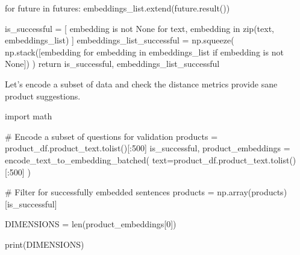 \documentclass[
  letterpaper,
  DIV=11,
  numbers=noendperiod]{scrreprt}
\newenvironment{Shaded}{\begin{snugshade}}{\end{snugshade}}
\newcommand{\BuiltInTok}[1]{\textcolor[rgb]{0.00,0.23,0.31}{#1}}
\newcommand{\CommentTok}[1]{\textcolor[rgb]{0.37,0.37,0.37}{#1}}
\newcommand{\ControlFlowTok}[1]{\textcolor[rgb]{0.00,0.23,0.31}{#1}}
\newcommand{\DecValTok}[1]{\textcolor[rgb]{0.68,0.00,0.00}{#1}}
\newcommand{\ImportTok}[1]{\textcolor[rgb]{0.00,0.46,0.62}{#1}}
\newcommand{\KeywordTok}[1]{\textcolor[rgb]{0.00,0.23,0.31}{#1}}
\newcommand{\NormalTok}[1]{\textcolor[rgb]{0.00,0.23,0.31}{#1}}
\newcommand{\OperatorTok}[1]{\textcolor[rgb]{0.37,0.37,0.37}{#1}}
\newcommand{\VariableTok}[1]{\textcolor[rgb]{0.07,0.07,0.07}{#1}}
\begin{document}
\begin{Shaded}
\begin{Highlighting}[]
        \ControlFlowTok{for}\NormalTok{ future }\KeywordTok{in}\NormalTok{ futures:}
\NormalTok{            embeddings\_list.extend(future.result())}

\NormalTok{    is\_successful }\OperatorTok{=}\NormalTok{ [}
\NormalTok{        embedding }\KeywordTok{is} \KeywordTok{not} \VariableTok{None} \ControlFlowTok{for}\NormalTok{ text, embedding }\KeywordTok{in} \BuiltInTok{zip}\NormalTok{(text, embeddings\_list)}
\NormalTok{    ]}
\NormalTok{    embeddings\_list\_successful }\OperatorTok{=}\NormalTok{ np.squeeze(}
\NormalTok{        np.stack([embedding }\ControlFlowTok{for}\NormalTok{ embedding }\KeywordTok{in}\NormalTok{ embeddings\_list }\ControlFlowTok{if}\NormalTok{ embedding }\KeywordTok{is} \KeywordTok{not} \VariableTok{None}\NormalTok{])}
\NormalTok{    )}
    \ControlFlowTok{return}\NormalTok{ is\_successful, embeddings\_list\_successful}
\end{Highlighting}
\end{Shaded}

Let's encode a subset of data and check the distance metrics provide
sane product suggestions.

\begin{Shaded}
\begin{Highlighting}[]
\ImportTok{import}\NormalTok{ math}

\CommentTok{\# Encode a subset of questions for validation}
\NormalTok{products }\OperatorTok{=}\NormalTok{ product\_df.product\_text.tolist()[:}\DecValTok{500}\NormalTok{]}
\NormalTok{is\_successful, product\_embeddings }\OperatorTok{=}\NormalTok{ encode\_text\_to\_embedding\_batched(}
\NormalTok{    text}\OperatorTok{=}\NormalTok{product\_df.product\_text.tolist()[:}\DecValTok{500}\NormalTok{]}
\NormalTok{)}

\CommentTok{\# Filter for successfully embedded sentences}
\NormalTok{products }\OperatorTok{=}\NormalTok{ np.array(products)[is\_successful]}
\end{Highlighting}
\end{Shaded}

\begin{Shaded}
\begin{Highlighting}[]
\NormalTok{DIMENSIONS }\OperatorTok{=} \BuiltInTok{len}\NormalTok{(product\_embeddings[}\DecValTok{0}\NormalTok{])}

\BuiltInTok{print}\NormalTok{(DIMENSIONS)}
\end{Highlighting}
\end{Shaded}
\end{document}
